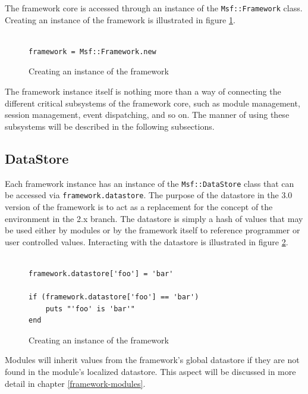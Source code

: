 \documentclass{report}
\begin{document}
\par
The framework core is accessed through an instance of the
\texttt{Msf::Framework} class.  Creating an instance of the
framework is illustrated in figure \ref{fig-code-framework-create}.

\begin{figure}[h]
\begin{verbatim}

framework = Msf::Framework.new
\end{verbatim}
\caption{Creating an instance of the framework}
\label{fig-code-framework-create}
\end{figure}

\par
The framework instance itself is nothing more than a way of
connecting the different critical subsystems of the framework core,
such as module management, session management, event dispatching,
and so on.  The manner of using these subsystems will be described
in the following subsections.

        \subsection{DataStore}

\par
Each framework instance has an instance of the
\texttt{Msf::DataStore} class that can be accessed via
\texttt{framework.datastore}.  The purpose of the datastore in the
3.0 version of the framework is to act as a replacement for the
concept of the environment in the 2.x branch.  The datastore is
simply a hash of values that may be used either by modules or by the
framework itself to reference programmer or user controlled values.
Interacting with the datastore is illustrated in figure
\ref{fig-code-framework-datastore}.

\begin{figure}[h]
\begin{verbatim}

framework.datastore['foo'] = 'bar'

if (framework.datastore['foo'] == 'bar')
    puts "'foo' is 'bar'"
end
\end{verbatim}
\caption{Creating an instance of the framework}
\label{fig-code-framework-datastore}
\end{figure}

\par
Modules will inherit values from the framework's global datastore if
they are not found in the module's localized datastore.  This aspect
will be discussed in more detail in chapter \ref{framework-modules}.
\end{document}

